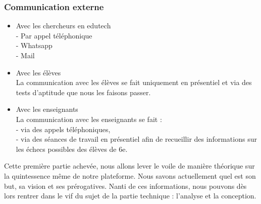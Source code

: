 \subsubsection{Communication externe }
  \begin{itemize}
    \item Avec les chercheurs en edutech \\
    		- Par appel téléphonique \\
			- Whatsapp \\
			- Mail

    \item Avec les élèves \\
     La communication avec les élèves se fait uniquement en présentiel et via des tests d’aptitude que nous les faisons passer.

    \item Avec les enseignants \\
    La communication avec les enseignants se fait : \\
		- via des appels téléphoniques, \\
		- via des séances de travail en présentiel afin de recueillir des informations sur les échecs possibles des élèves de 6e.
  \end{itemize}
  
  Cette première partie achevée, nous allons lever le voile de manière théorique sur la quintessence même de notre plateforme. Nous savons actuellement quel est son but, sa vision et ses prérogatives. Nanti de ces informations, nous pouvons dès lors rentrer dans le vif du sujet de la partie technique : l’analyse et la conception. 